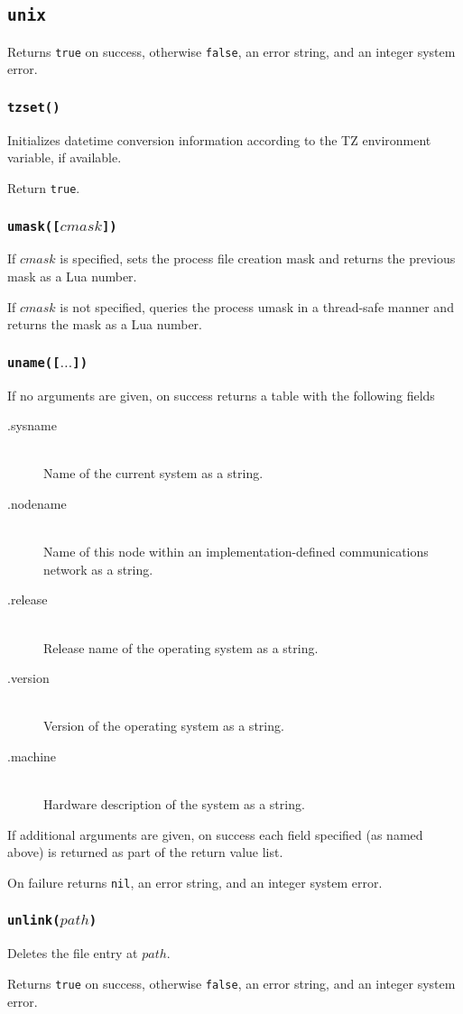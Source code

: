 \documentclass[11pt, oneside]{memoir}
\newcommand*{\true}[0]{\texttt{true}\xspace}
\newcommand*{\false}[0]{\texttt{false}\xspace}
\newcommand*{\nil}[0]{\texttt{nil}\xspace}
\newcommand*{\fn}[1]{\texttt{#1}\xspace}
\newcounter{toccols}
\newenvironment{Module}[1]{
	\subsection{\texttt{#1}}
	\addtocontents{toc}{
		\protect\begin{multicols}{\value{toccols}}
	}
}{
	\addtocontents{toc}{\protect\end{multicols}}
}
\begin{document}
\begin{Module}{unix}
Returns \true on success, otherwise \false, an error string, and an integer system error. 

\subsubsection[\fn{tzset}]{\fn{tzset()}}

Initializes datetime conversion information according to the TZ environment variable, if available.

Return \true.

\subsubsection[\fn{umask}]{\fn{umask([$cmask$])}}

If $cmask$ is specified, sets the process file creation mask and returns the previous mask as a Lua number.

If $cmask$ is not specified, queries the process umask in a thread-safe manner and returns the mask as a Lua number.

\subsubsection[\fn{uname}]{\fn{uname([$\ldots$])}}

If no arguments are given, on success returns a table with the following fields

\begin{description}
\item[.sysname] \hfill \\
Name of the current system as a string.
\item[.nodename] \hfill \\
Name of this node within an implementation-defined communications network as a string.
\item[.release] \hfill \\
Release name of the operating system as a string.
\item[.version] \hfill \\
Version of the operating system as a string.
\item[.machine] \hfill \\
Hardware description of the system as a string.
\end{description}

If additional arguments are given, on success each field specified (as named above) is returned as part of the return value list.

On failure returns \nil, an error string, and an integer system error.

\subsubsection[\fn{unlink}]{\fn{unlink($path$)}}

Deletes the file entry at $path$.

Returns \true on success, otherwise \false, an error string, and an integer system error. 

\end{Module}
\end{document}
